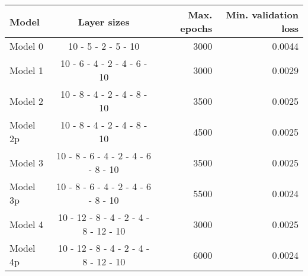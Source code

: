 \begin{tabular}{lcrr}
\toprule
 Model    &              Layer sizes              &   Max. epochs &   Min. validation loss \\
\midrule
 Model 0  &          10 - 5 - 2 - 5 - 10          &          3000 &                 0.0044 \\
 Model 1  &      10 - 6 - 4 - 2 - 4 - 6 - 10      &          3000 &                 0.0029 \\
 Model 2  &      10 - 8 - 4 - 2 - 4 - 8 - 10      &          3500 &                 0.0025 \\
 Model 2p &      10 - 8 - 4 - 2 - 4 - 8 - 10      &          4500 &                 0.0025 \\
 Model 3  &  10 - 8 - 6 - 4 - 2 - 4 - 6 - 8 - 10  &          3500 &                 0.0025 \\
 Model 3p &  10 - 8 - 6 - 4 - 2 - 4 - 6 - 8 - 10  &          5500 &                 0.0024 \\
 Model 4  & 10 - 12 - 8 - 4 - 2 - 4 - 8 - 12 - 10 &          3000 &                 0.0025 \\
 Model 4p & 10 - 12 - 8 - 4 - 2 - 4 - 8 - 12 - 10 &          6000 &                 0.0024 \\
\bottomrule
\end{tabular}